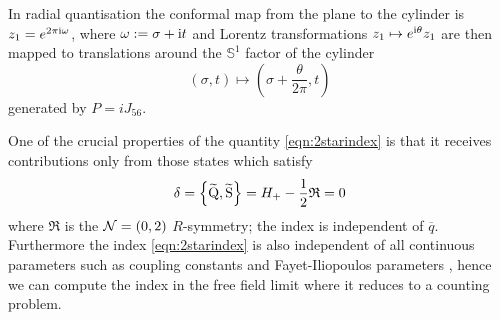 \documentclass[main.tex]{subfiles}
\begin{document}
In radial quantisation the conformal map from the plane to the cylinder is $z_1=e^{2\pi\mathrm{i} \omega}$, where $\omega:=\sigma+\mathrm{i} t$ and Lorentz transformations $z_1\mapsto e^{\mathrm{i}\theta}z_1$ are then mapped to translations around the $\mathbb{S}^1$ factor of the cylinder
\begin{equation}\label{lorentz}
\left(\sigma,t\right)\mapsto \left(\sigma+\frac{\theta}{2\pi}, t\right)
\end{equation}
generated by $P=i J_{56}$. 

One of the crucial properties of the quantity \eqref{eqn:2starindex} is that it receives contributions only from those states which satisfy 
\begin{equation}\label{eq:delta}
\delta= \left\{ \widetilde{\mathrm{Q}} , \widetilde{\mathrm{S}} \right\} =H_+-\frac{1}{2}\mathfrak{R}
=0
\end{equation}
where $\mathfrak{R}$ is the $\mathcal{N}=(0,2)$ $R$-symmetry; the index is independent of $\overline{q}$. Furthermore the index \eqref{eqn:2starindex} is also independent of all continuous parameters such as coupling constants and Fayet-Iliopoulos parameters \cite{Witten:1982df,Kinney:2005ej}, hence we can compute the index in the free field limit where it reduces to a counting problem.
\end{document}
